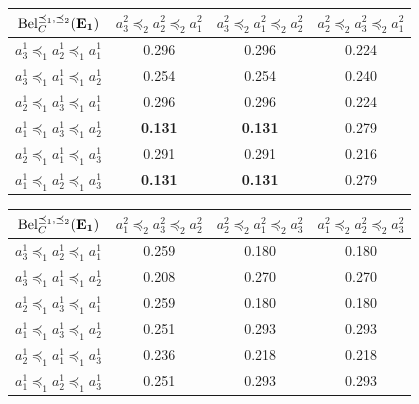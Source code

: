 \begin{example}
\begin{center}
\begin{tabular}{|c||c|c|c|}
\hline
$\mathrm{Bel}^{\preceq_1,\preceq_2}_C(\mathbf{E_1})$ & $a^2_3\preceq_2a^2_2\preceq_2a^2_1$ & $a^2_3\preceq_2a^2_1\preceq_2a^2_2$ & $a^2_2\preceq_2a^2_3\preceq_2a^2_1$ \\ \hline\hline
$a^1_3\preceq_1a^1_2\preceq_1a^1_1$ & 0.296 & 0.296 & 0.224 \\ \hline
$a^1_3\preceq_1a^1_1\preceq_1a^1_2$ & 0.254 & 0.254 & 0.240 \\ \hline
$a^1_2\preceq_1a^1_3\preceq_1a^1_1$ & 0.296 & 0.296 & 0.224 \\ \hline
$a^1_1\preceq_1a^1_3\preceq_1a^1_2$ & \textbf{0.131} & \textbf{0.131} & 0.279 \\ \hline
$a^1_2\preceq_1a^1_1\preceq_1a^1_3$ & 0.291 & 0.291 & 0.216 \\ \hline
$a^1_1\preceq_1a^1_2\preceq_1a^1_3$ & \textbf{0.131} & \textbf{0.131} & 0.279 \\ \hline
\end{tabular}

\vspace{0.5cm}

\begin{tabular}{|c||c|c|c|}
\hline
$\mathrm{Bel}^{\preceq_1,\preceq_2}_C(\mathbf{E_1})$ & $a^2_1\preceq_2a^2_3\preceq_2a^2_2$ & $a^2_2\preceq_2a^2_1\preceq_2a^2_3$ & $a^2_1\preceq_2a^2_2\preceq_2a^2_3$ \\ \hline\hline
$a^1_3\preceq_1a^1_2\preceq_1a^1_1$ & 0.259 & 0.180 & 0.180 \\ \hline
$a^1_3\preceq_1a^1_1\preceq_1a^1_2$ & 0.208 & 0.270 & 0.270 \\ \hline
$a^1_2\preceq_1a^1_3\preceq_1a^1_1$ & 0.259 & 0.180 & 0.180 \\ \hline
$a^1_1\preceq_1a^1_3\preceq_1a^1_2$ & 0.251 & 0.293 & 0.293 \\ \hline
$a^1_2\preceq_1a^1_1\preceq_1a^1_3$ & 0.236 & 0.218 & 0.218 \\ \hline
$a^1_1\preceq_1a^1_2\preceq_1a^1_3$ & 0.251 & 0.293 & 0.293 \\ \hline
\end{tabular}

\vspace{1cm}


\end{center}
\end{example}
